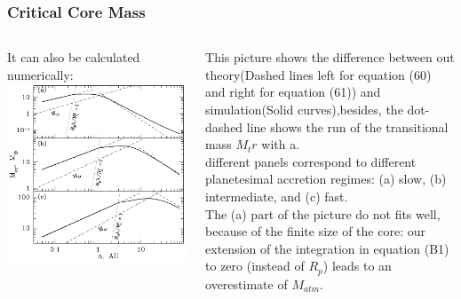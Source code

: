 \documentclass{beamer}
\begin{document}
\begin{frame}
\frametitle{Critical Core Mass}
\begin{columns}[t] 
\begin{column}{0.5\textwidth} 
It can also be calculated numerically:
\vspace{-0.1cm}
\includegraphics[width=\textwidth]{Critical Core Mass.png}
\end{column} 
\begin{column}{0.5\textwidth}
This picture shows the difference between out theory(Dashed lines left for equation (60) and right for equation (61)) and simulation(Solid curves),besides, the dot-dashed line shows the run of
the transitional mass $M_tr$ with a.\\
different panels correspond to different planetesimal accretion regimes: (a) slow, (b) intermediate, and (c) fast.\\
The (a) part of the picture do not fits well, because of the finite size of the core: our extension of the integration in equation (B1) to zero (instead of $R_p$) leads to an overestimate of $M_{atm}$.
\end{column} 
\end{columns}
\end{frame}
\end{document}
